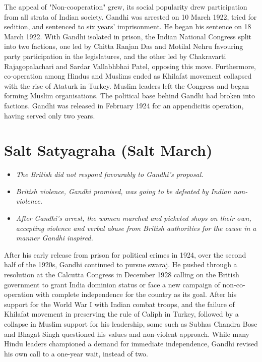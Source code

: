 The appeal of "Non-cooperation" grew, its social popularity drew
participation from all strata of Indian society. Gandhi was arrested on
10 March 1922, tried for sedition, and sentenced to six years'
imprisonment. He began his sentence on 18 March 1922. With Gandhi
isolated in prison, the Indian National Congress split into two
factions, one led by Chitta Ranjan Das and Motilal Nehru favouring party
participation in the legislatures, and the other led by Chakravarti
Rajagopalachari and Sardar Vallabhbhai Patel, opposing this move.
Furthermore, co-operation among Hindus and Muslims ended as Khilafat
movement collapsed with the rise of Ataturk in Turkey. Muslim leaders
left the Congress and began forming Muslim organisations. The political
base behind Gandhi had broken into factions. Gandhi was released in
February 1924 for an appendicitis operation, having served only two
years.

\section{Salt Satyagraha (Salt March)}\label{salt-satyagraha-salt-march}

\begin{itemize}
\item
  \emph{The British did not respond favourably to Gandhi's proposal.}
\item
  \emph{British violence, Gandhi promised, was going to be defeated by
  Indian non-violence.}
\item
  \emph{After Gandhi's arrest, the women marched and picketed shops on
  their own, accepting violence and verbal abuse from British
  authorities for the cause in a manner Gandhi inspired.}
\end{itemize}

After his early release from prison for political crimes in 1924, over
the second half of the 1920s, Gandhi continued to pursue swaraj. He
pushed through a resolution at the Calcutta Congress in December 1928
calling on the British government to grant India dominion status or face
a new campaign of non-co-operation with complete independence for the
country as its goal. After his support for the World War I with Indian
combat troops, and the failure of Khilafat movement in preserving the
rule of Caliph in Turkey, followed by a collapse in Muslim support for
his leadership, some such as Subhas Chandra Bose and Bhagat Singh
questioned his values and non-violent approach. While many Hindu leaders
championed a demand for immediate independence, Gandhi revised his own
call to a one-year wait, instead of two.

